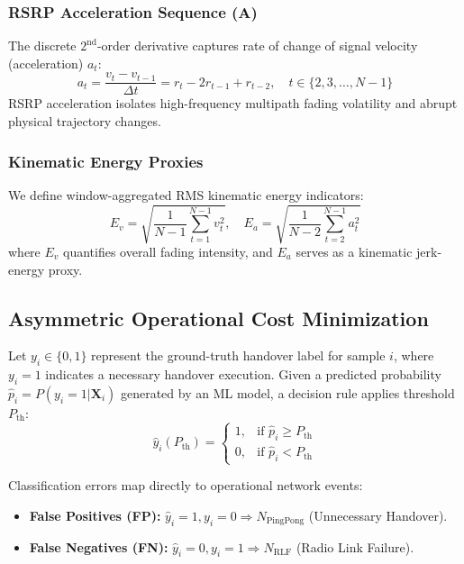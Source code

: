 \documentclass[conference]{IEEEtran}
\begin{document}
\subsubsection{RSRP Acceleration Sequence ($\mathbf{A}$)}
The discrete $2^{\text{nd}}$-order derivative captures rate of change of signal velocity (acceleration) $a_t$:
\begin{equation}
a_t = \frac{v_t - v_{t-1}}{\Delta t} = r_t - 2r_{t-1} + r_{t-2}, \quad t \in \{2, 3, \dots, N-1\}
\end{equation}
RSRP acceleration isolates high-frequency multipath fading volatility and abrupt physical trajectory changes.

\subsubsection{Kinematic Energy Proxies}
We define window-aggregated RMS kinematic energy indicators:
\begin{equation}
E_v = \sqrt{\frac{1}{N-1}\sum_{t=1}^{N-1} v_t^2}, \quad E_a = \sqrt{\frac{1}{N-2}\sum_{t=2}^{N-1} a_t^2}
\end{equation}
where $E_v$ quantifies overall fading intensity, and $E_a$ serves as a kinematic jerk-energy proxy.

\subsection{Asymmetric Operational Cost Minimization}
Let $y_i \in \{0, 1\}$ represent the ground-truth handover label for sample $i$, where $y_i = 1$ indicates a necessary handover execution. Given a predicted probability $\hat{p}_i = P(y_i = 1 | \mathbf{X}_i)$ generated by an ML model, a decision rule applies threshold $P_{\text{th}}$:
\begin{equation}
\hat{y}_i(P_{\text{th}}) = 
\begin{cases} 
1, & \text{if } \hat{p}_i \ge P_{\text{th}} \\
0, & \text{if } \hat{p}_i < P_{\text{th}}
\end{cases}
\end{equation}

Classification errors map directly to operational network events:
\begin{itemize}
    \item \textbf{False Positives (FP):} $\hat{y}_i = 1, y_i = 0 \Rightarrow N_{\text{PingPong}}$ (Unnecessary Handover).
    \item \textbf{False Negatives (FN):} $\hat{y}_i = 0, y_i = 1 \Rightarrow N_{\text{RLF}}$ (Radio Link Failure).
\end{itemize}
\end{document}
